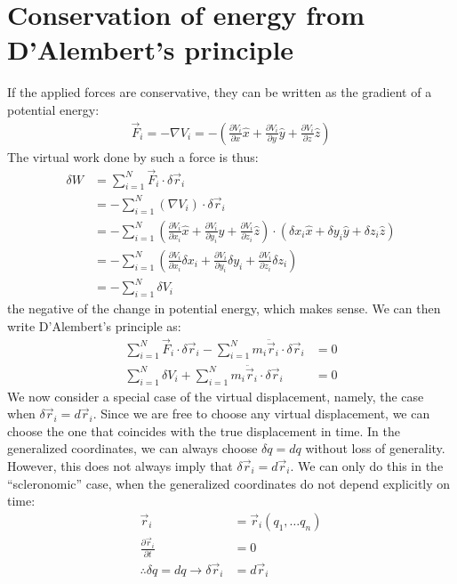 \section{Conservation of energy from D'Alembert's principle}
If the applied forces are conservative, they can be written as the gradient of a potential energy:
\begin{align}
\vec{F}_i=-\nabla V_i = -\left(\frac{\partial V_i}{\partial x}\hat{x}+\frac{\partial V_i}{\partial y}\hat{y}+\frac{\partial V_i}{\partial z}\hat{z}\right)
\end{align}
The virtual work done by such a force is thus:
\begin{align}
\delta W &= \sum_{i=1}^N \vec{F}_i\cdot\delta\vec{r}_i\nonumber\\
&=-\sum_{i=1}^N(\nabla V_i)\cdot\delta\vec{r}_i\nonumber\\
&=-\sum_{i=1}^N \left(\frac{\partial V_i}{\partial x_i}\hat{x}+\frac{\partial V_i}{\partial y_i}\hat{y}+\frac{\partial V_i}{\partial z_i}\hat{z}\right)\cdot(\delta x_i\hat{x}+\delta y_i\hat{y}+\delta z_i\hat{z})\nonumber\\
&=-\sum_{i=1}^N\left(\frac{\partial V_i}{\partial x_i}\delta x_i+\frac{\partial V_i}{\partial y_i}\delta y_i+\frac{\partial V_i}{\partial z_i}\delta z_i\right)\nonumber\\
&=-\sum_{i=1}^N \delta V_i\nonumber
\end{align}
the negative of the change in potential energy, which makes sense. We can then write D'Alembert's principle as:
\begin{align}
\sum_{i=1}^N \vec{F}_i\cdot\delta\vec{r}_i-\sum_{i=1}^N m_i\ddot{\vec{r}}_i\cdot\delta\vec{r}_i&=0\nonumber\\
\sum_{i=1}^N\delta V_i +\sum_{i=1}^N m_i\ddot{\vec{r}}_i\cdot\delta\vec{r}_i&=0\nonumber
\end{align}
We now consider a special case of the virtual displacement, namely, the case when $\delta\vec{r}_i=d\vec{r}_i$. Since we are free to choose any virtual displacement, we can choose the one that coincides with the true displacement in time. In the generalized coordinates,  we can always choose $\delta q = dq$ without loss of generality. However, this does not always imply that $\delta \vec{r}_i=d\vec{r}_i$. We can only do this in the ``scleronomic'' case, when the generalized coordinates do not depend explicitly on time:
\begin{align}
\vec{r}_i&=\vec{r}_i(q_1,\dots q_n)\nonumber\\
\frac{\partial \vec{r}_i}{\partial t}&= 0\nonumber\\
\therefore \delta q=dq\to \delta \vec{r}_i&=d\vec{r}_i\nonumber
\end{align}

